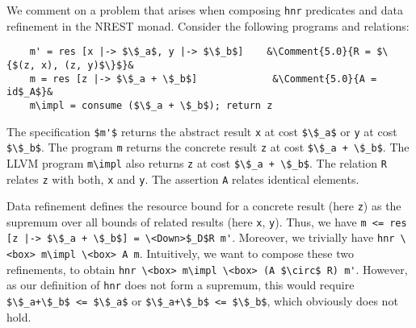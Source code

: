\documentclass[acmsmall]{acmart}
\newcommand*{\Comment}[2]{\hfill\makebox[#1cm][l]{\textup{#2}}}%
\newcommand{\is}{\lstinline[language=isabelle]}
\begin{document}
%
%
%
%
%
%
%
%
%
%
We comment on a problem that arises when composing \is{hnr} predicates and data refinement in the NREST monad.
Consider the following programs and relations:
\begin{lstlisting}
    m' = res [x |-> $\$_a$, y |-> $\$_b$]    &\Comment{5.0}{R = $\{$(z, x), (z, y)$\}$}&
    m = res [z |-> $\$_a + \$_b$]             &\Comment{5.0}{A = id$_A$}&
    m\impl = consume ($\$_a + \$_b$); return z
\end{lstlisting}
%
The specification \is{$m'$} returns the abstract result \is{x} at cost \is{$\$_a$} or \is{y} at cost \is{$\$_b$}. 
The program \is{m} returns the concrete result \is{z} at cost \is{$\$_a + \$_b$}. 
The LLVM program \is{m\impl} also returns \is{z} at cost \is{$\$_a + \$_b$}. 
The relation \is$R$ relates \is$z$ with both, \is$x$ and \is$y$. The assertion \is$A$ relates identical elements.

Data refinement defines the resource bound for a concrete result (here \is{z}) as the supremum over all bounds of related results (here \is{x}, \is{y}). Thus, we have \is{m <= res [z |-> $\$_a + \$_b$] = \<Down>$_D$R m'}. 
Moreover, we trivially have \is{hnr \<box> m\impl \<box> A m}.
Intuitively, we want to compose these two refinements, to obtain
\is{hnr \<box> m\impl \<box> (A $\circ$ R) m'}.
However, as our definition of \is{hnr} does not form a supremum, this would require \is{$\$_a+\$_b$ <= $\$_a$} or \is{$\$_a+\$_b$ <= $\$_b$}, which obviously does not hold.
\end{document}

